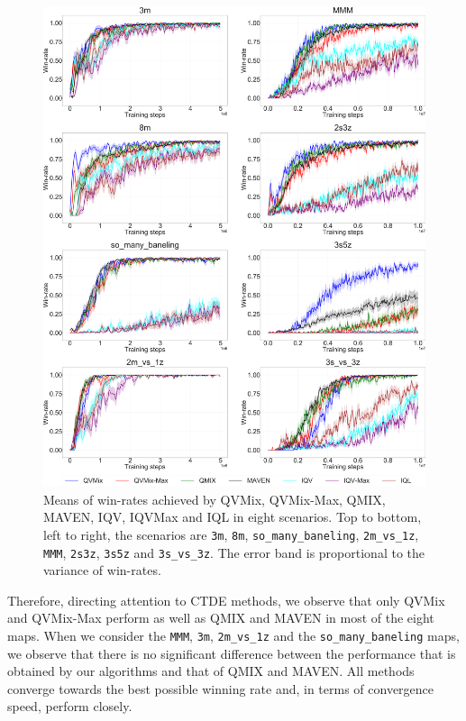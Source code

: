 \begin{figure}
\centering
\includegraphics[width=.95\linewidth]{tex_thesis/figures/ch4/all_win.pdf}
\caption{Means of win-rates achieved by QVMix, QVMix-Max, QMIX, MAVEN, IQV, IQVMax and IQL in eight scenarios. Top to bottom, left to right, the scenarios are \texttt{3m}, \texttt{8m}, \texttt{so\_many\_baneling}, \texttt{2m\_vs\_1z}, \texttt{MMM}, \texttt{2s3z}, \texttt{3s5z} and \texttt{3s\_vs\_3z}. The error band is proportional to the variance of win-rates.}
\label{fig:all_win_curves}
\end{figure}

Therefore, directing attention to CTDE methods, we observe that only QVMix and QVMix-Max perform as well as QMIX and MAVEN in most of the eight maps.
When we consider the \texttt{MMM}, \texttt{3m}, \texttt{2m\_vs\_1z} and the \texttt{so\_many\_baneling} maps, we observe that there is no significant difference between the performance that is obtained by our algorithms and that of QMIX and MAVEN. 
All methods converge towards the best possible winning rate and, in terms of convergence speed, perform closely.

